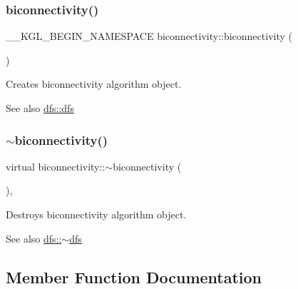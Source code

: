 \subsubsection{\texorpdfstring{biconnectivity()}{biconnectivity()}}
{\footnotesize\ttfamily \+\_\+\+\_\+\+K\+G\+L\+\_\+\+B\+E\+G\+I\+N\+\_\+\+N\+A\+M\+E\+S\+P\+A\+CE biconnectivity\+::biconnectivity (\begin{DoxyParamCaption}{ }\end{DoxyParamCaption})}



Creates biconnectivity algorithm object. 

\begin{DoxySeeAlso}{See also}
\mbox{\hyperlink{classdfs_a5232bc41ab202b6278a84bd97c803a0d}{dfs\+::dfs}} 
\end{DoxySeeAlso}
\mbox{\label{classbiconnectivity_af8e2bb061de4a08f95a2a3a94fdbd797}} 
\subsubsection{\texorpdfstring{$\sim$biconnectivity()}{~biconnectivity()}}
{\footnotesize\ttfamily virtual biconnectivity\+::$\sim$biconnectivity (\begin{DoxyParamCaption}{ }\end{DoxyParamCaption})\hspace{0.3cm}{\ttfamily [inline]}, {\ttfamily [virtual]}}



Destroys biconnectivity algorithm object. 

\begin{DoxySeeAlso}{See also}
\mbox{\hyperlink{classdfs_aff2e95c12935221a94551393f7e36c6e}{dfs\+::$\sim$dfs}} 
\end{DoxySeeAlso}


\subsection{Member Function Documentation}
\mbox{\label{classbiconnectivity_a896398c41cf0c84714b4cc7475aafc6e}} 
